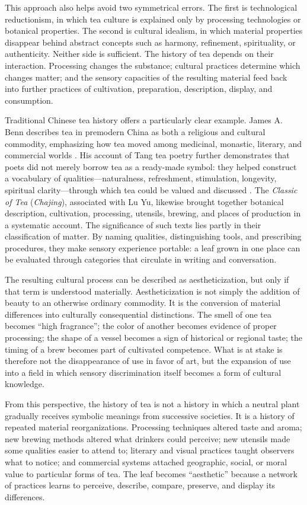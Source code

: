 \documentclass[numbers]{IntechOpen-Book}
\begin{document}
This approach also helps avoid two symmetrical errors. The first is technological reductionism, in which tea culture is explained only by processing technologies or botanical properties. The second is cultural idealism, in which material properties disappear behind abstract concepts such as harmony, refinement, spirituality, or authenticity. Neither side is sufficient. The history of tea depends on their interaction. Processing changes the substance; cultural practices determine which changes matter; and the sensory capacities of the resulting material feed back into further practices of cultivation, preparation, description, display, and consumption.

Traditional Chinese tea history offers a particularly clear example. James A. Benn describes tea in premodern China as both a religious and cultural commodity, emphasizing how tea moved among medicinal, monastic, literary, and commercial worlds \cite{benn2015book}. His account of Tang tea poetry further demonstrates that poets did not merely borrow tea as a ready-made symbol: they helped construct a vocabulary of qualities---naturalness, refreshment, stimulation, longevity, spiritual clarity---through which tea could be valued and discussed \cite{benn2015poetry}. The \textit{Classic of Tea} (\textit{Chajing}), associated with Lu Yu, likewise brought together botanical description, cultivation, processing, utensils, brewing, and places of production in a systematic account. The significance of such texts lies partly in their classification of matter. By naming qualities, distinguishing tools, and prescribing procedures, they make sensory experience portable: a leaf grown in one place can be evaluated through categories that circulate in writing and conversation.

The resulting cultural process can be described as aestheticization, but only if that term is understood materially. Aestheticization is not simply the addition of beauty to an otherwise ordinary commodity. It is the conversion of material differences into culturally consequential distinctions. The smell of one tea becomes ``high fragrance''; the color of another becomes evidence of proper processing; the shape of a vessel becomes a sign of historical or regional taste; the timing of a brew becomes part of cultivated competence. What is at stake is therefore not the disappearance of use in favor of art, but the expansion of use into a field in which sensory discrimination itself becomes a form of cultural knowledge.

From this perspective, the history of tea is not a history in which a neutral plant gradually receives symbolic meanings from successive societies. It is a history of repeated material reorganizations. Processing techniques altered taste and aroma; new brewing methods altered what drinkers could perceive; new utensils made some qualities easier to attend to; literary and visual practices taught observers what to notice; and commercial systems attached geographic, social, or moral value to particular forms of tea. The leaf becomes ``aesthetic'' because a network of practices learns to perceive, describe, compare, preserve, and display its differences.
\end{document}
